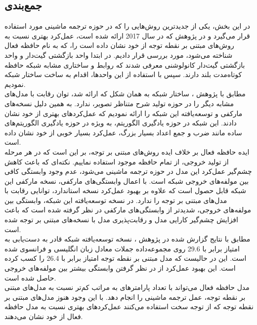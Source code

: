 \subsection{جمع‌بندی}
در این بخش، یکی از جدید‌ترین روش‌هایی را که در حوزه ترجمه ماشینی مورد استفاده قرار می‌گیرد و در پژوهش \cite{lukas2017can} که در سال 2017 ارائه شده است، عمل‌کرد بهتری نسبت به روش‌های مبتنی بر نقطه توجه از خود نشان داده است را، که به نام حافظه فعال شناخته می‌شود، مورد بررسی قرار دادیم.  در ابتدا واحد بازگشتی‌ گیت‌دار و واحد بازگشتی گیت‌دار کانولوشنی معرفی شدند که روابط و ساختاری مشابه شبکه حافظه کوتاه‌مدت بلند دارند. سپس با استفاده از این واحد‌ها، اقدام به ساخت ساختار شبکه  نمودیم.
\\
مطابق با پژوهش \cite{lukas2017can}، ساختار شبکه  به همان شکل که ارائه شد، توان رقابت با مدل‌های مشابه دیگر را در حوزه تولید شرح متناظر تصویر، ندارد. به همین دلیل نسخه‌های مارکفی و توسعه‌یافته این شبکه را ارائه نمودیم که عمل‌کردهای بهتری از خود نشان دادند. این شبکه در حوزه یادگیری الگوریتم‌، به ويژه در حوزه یادگیری الگوریتم‌های ساده مانند ضرب و جمع اعداد بسیار بزرگ، عمل‌کرد بسیار خوبی  از خود نشان داده است.
\\
ایده حافظه فعال بر خلاف ایده روش‌های مبتنی بر توجه، بر این است که در هر مرحله از تولید خروجی، از تمام حافظه موجود استفاده نماییم. نکته‌ای که باعث کاهش چشم‌گیر عمل‌کرد این مدل در حوزه ترجمه ماشینی می‌شود، عدم وجود وابستگی کافی بین مولفه‌های خروجی شبکه است. با اعمال وابستگی‌های مارکفی، نسخه مارکفی این شبکه قابل حصول است که علاوه بر بهبود عمل‌کرد نسخه استاندارد، توانایی رقابت با مدل‌های مبتنی بر توجه را ندارد. در نسخه توسعه‌یافته این شبکه، وابستگی بین مولفه‌های خروجی، شدیدتر از وابستگی‌های مارکفی در نظر گرفته شده است که باعث افزایش چشم‌گیر کارایی مدل و رقابت‌پذیری مدل با نسخه‌های مبتنی بر توجه شده است. 
\\
مطابق با نتایج گزارش شده در پژوهش \cite{lukas2017can}، نسخه توسعه‌یافته شبکه قادر به دست‌یابی به امتیاز  برابر با 29.6 روی مجموعه‌داده جملات معادل زبان انگلیسی و فرانسوی شده است. این در حالیست که مدل مبتنی بر نقطه توجه امتیاز  برابر با 26.4 را کسب کرده است. این بهبود عمل‌کرد از در نظر گرفتن وابستگی بیشتر بین مولفه‌های خروجی حاصل شده است.
\\
مدل حافظه فعال می‌تواند با تعداد پارامترهای به مراتب کم‌تر نسبت به مدل‌های مبتنی بر نقطه توجه، عمل ترجمه ماشینی را انجام دهد. با این وجود هنوز مدل‌های مبتنی بر نقطه توجه که از توجه سخت استفاده می‌کنند عمل‌کرد‌های بهتری نسبت به مدل‌ حافظه فعال از خود نشان می‌دهند. 
